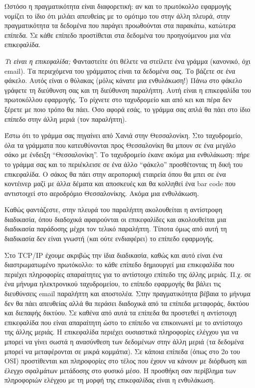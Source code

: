 Ωστόσο η πραγματικότητα είναι διαφορετική: αν και το πρωτόκολλο εφαρμογής νομίζει το ίδιο ότι μιλάει απευθείας με το ομότιμο του στην άλλη πλευρά, στην πραγματικότητα τα δεδομένα που παράγει προωθούνται στα παρακάτω, κατώτερα επίπεδα. Σε κάθε επίπεδο προστίθεται στα δεδομένα του προηγούμενου μια νέα επικεφαλίδα.

\begin{inthebox}
\emph{Τι είναι η επικεφαλίδα;} Φανταστείτε ότι θέλετε να στείλετε ένα γράμμα (κανονικό, όχι email). Τα περιεχόμενα του γράμματος είναι τα δεδομένα σας. Το βάζετε σε ένα φάκελο. Αυτός είναι ο θύλακας (μόλις κάνατε μια ενθυλάκωση!) Πάνω στο φάκελο γράφετε τη διεύθυνση σας και τη διεύθυνση παραλήπτη. Αυτή είναι η επικεφαλίδα του πρωτοκόλλου εφαρμογής. Το ρίχνετε στο ταχυδρομείο και από κει και πέρα δεν ξέρετε με ποιο τρόπο θα πάει. Όσο αφορά εσάς, το γράμμα σας απλά θα πάει στο ίδιο επίπεδο στην άλλη μεριά (τον παραλήπτη).

Έστω ότι το γράμμα σας πηγαίνει από Χανιά στην Θεσσαλονίκη. Στο ταχυδρομείο, όλα τα γράμματα που κατευθύνονται προς Θεσσαλονίκη θα μπουν σε ένα μεγάλο σάκο με ένδειξη ``Θεσσαλονίκη''. Το ταχυδρομείο έκανε ακόμα μια ενθυλάκωση: πήρε το γράμμα σας και το περιέκλεισε σε ένα άλλο ``φάκελο'' προσθέτοντας τη δική του επικεφαλίδα. Ο σάκος θα πάει στην αεροπορική εταιρεία όπου θα μπει σε ένα κοντέινερ μαζί με άλλα δέματα και αποσκευές και θα κολληθεί ένα bar code που αντιστοιχεί στο αεροδρόμιο Θεσσαλονίκης. Ακόμα μια ενθυλάκωση.

Καθώς φαντάζεστε, στην πλευρά του παραλήπτη ακολουθείται η αντίστροφη διαδικασία, όπου διαδοχικά αφαιρούνται οι επικεφαλίδες και ακολουθείται μια διαδικασία παράδοσης μέχρι τον τελικό παραλήπτη. Τίποτα όμως από αυτή τη διαδικασία δεν είναι γνωστή (και ούτε ενδιαφέρει) το επίπεδο εφαρμογής.\\
\end{inthebox}

Στο TCP/IP έχουμε ακριβώς την ίδια διαδικασία, καθώς και αυτό είναι ένα διαστρωματωμένο πρωτόκολλο: το κάθε επίπεδο δημιουργεί μια επικεφαλίδα που περιέχει πληροφορίες απαραίτητες για το αντίστοιχο επίπεδο της άλλης μεριάς. Π.χ. σε ένα μήνυμα ηλεκτρονικού ταχυδρομείου, το επίπεδο εφαρμογής θα βάλει τις διευθύνσεις email παραλήπτη και αποστολέα. Στην πραγματικότητα βέβαια το μήνυμα δεν θα πάει απευθείας αλλά θα περάσει διαδοχικά από τα επίπεδα μεταφοράς, δικτύου και διεπαφής δικτύου. Σε καθένα από αυτά τα επίπεδα θα προστεθεί η αντίστοιχη επικεφαλίδα που είναι απαραίτητη ώστο το επίπεδο να επικοινωνεί με το αντίστοιχο της άλλης μεριάς. Η επικεφαλίδα περιέχει ουσιαστικά πληροφορίες ελέγχου για να μπορεί να γίνει σωστά η ανασύνθεση των δεδομένων στην άλλη μεριά (τα δεδομένα μπορεί να μεταφέρονται σε μικρά κομμάτια). Σε κάποια επίπεδα (όπως στο 2ο του OSI) προστίθενται και πληροφορίες στο τέλος που έχουν να κάνουν με διόρθωση και έλεγχο σφαλμάτων μετάδοσης στο φυσικό μέσο. Η προσθήκη σαν περίβλημα των πληροφοριών ελέγχου με τη μορφή της επικεφαλίδας είναι η ενθυλάκωση.


